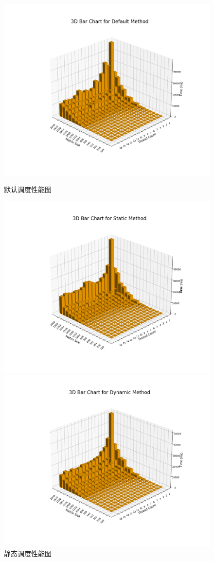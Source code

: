 \documentclass[a4paper, utf8]{ctexart}
\begin{document}
	\begin{figure}[htbp]
		\centering
		\begin{minipage}{.32\textwidth}
			\centering
			\includegraphics[width=.8\textwidth]{./figure/default_barchart.png}
			\caption{默认调度性能图}
		\end{minipage}
		\begin{minipage}{.32\textwidth}
			\centering
			\includegraphics[width=.8\textwidth]{./figure/static_barchart.png}
			\caption{静态调度性能图}
		\end{minipage}
		\begin{minipage}{.32\textwidth}
			\centering
			\includegraphics[width=.8\textwidth]{./figure/dynamic_barchart.png}

\end{minipage}
\end{figure}
\end{document}
